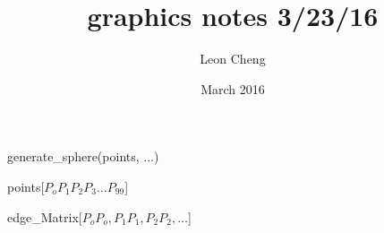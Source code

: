 \documentclass{article}
\title{graphics notes 3/23/16}
\author{Leon Cheng}
\date{March 2016}
\begin{document}
\maketitle


generate\_sphere(points, ...)

points[$P_o P_1 P_2 P_3 \dots P_{99}$]

edge\_Matrix[$P_o P_o, P_1 P_1, P_2 P_2, \dots$]
\end{document}
